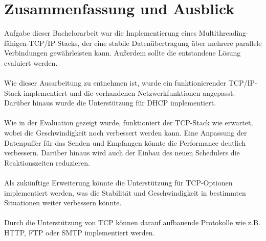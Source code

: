 \chapter{Zusammenfassung und Ausblick}

Aufgabe dieser Bachelorarbeit war die Implementierung eines Multithreading-fähigen-TCP/IP-Stacks, der eine stabile Datenübertragung über mehrere parallele Verbindungen gewährleisten kann. Außerdem sollte die entstandene Lösung evaluiert werden. \\\\
Wie dieser Ausarbeitung zu entnehmen ist, wurde ein funktionierender TCP/IP-Stack implementiert und die vorhandenen Netzwerkfunktionen angepasst. Darüber hinaus wurde die Unterstützung für DHCP implementiert. \\\\
Wie in der Evaluation gezeigt wurde, funktioniert der TCP-Stack wie erwartet, wobei die Geschwindigkeit noch verbessert werden kann. Eine Anpassung der Datenpuffer für das Senden und Empfangen könnte die Performance deutlich verbessern. Darüber hinaus wird auch der Einbau des neuen Schedulers die Reaktionszeiten reduzieren. \\\\
Als zukünftige Erweiterung könnte die Unterstützung für TCP-Optionen implementiert werden, was die Stabilität und Geschwindigkeit in bestimmten Situationen weiter verbessern könnte.\\\\
Durch die Unterstützung von TCP können darauf aufbauende Protokolle wie z.B. HTTP, FTP oder SMTP implementiert werden. 


